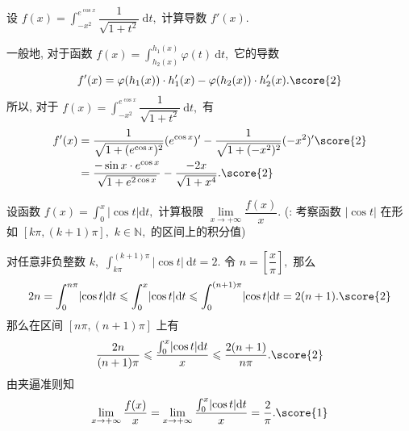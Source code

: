 \begin{question}[points = 6]
设 $\displaystyle f(x) = \int_{-x^2}^{e^{\cos x}} \dfrac{1}{\sqrt{1 + t^2}} ~ \mathrm{d}t,$ 计算导数 $f'(x).$

\end{question}

\begin{solution}
一般地, 对于函数 $\displaystyle f(x) = \int_{h_2(x)}^{h_1(x)} \varphi(t) ~ \mathrm{d}t,$ 它的导数
\begin{equation*}
f'(x) = \varphi(h_1(x)) \cdot h_1'(x) - \varphi(h_2(x)) \cdot h_2'(x). \score{2}
\end{equation*}
所以, 对于 $\displaystyle f(x) = \int_{-x^2}^{e^{\cos x}} \dfrac{1}{\sqrt{1 + t^2}} ~ \mathrm{d}t,$ 有
\begin{align*}
f'(x) & = \dfrac{1}{\sqrt{1 + (e^{\cos x})^2}}(e^{\cos x})' - \dfrac{1}{\sqrt{1 + (-x^2)^2}} (-x^2)' \score{2} \\
& = \dfrac{-\sin x \cdot e^{\cos x}}{\sqrt{1 + e^{2\cos x}}} - \dfrac{-2x}{\sqrt{1 + x^4}}. \score{2}
\end{align*}
\end{solution}


\begin{question}[points = 6]
设函数 $f(x) = \int_0^x \lvert \cos t \rvert \mathrm{d} t,$ 计算极限 $\lim\limits_{x\to+\infty} \dfrac{f(x)}{x}.$\newline
(: 考察函数 $\lvert \cos t \rvert$ 在形如 $[k\pi, (k+1)\pi],$ $k \in \mathbb{N},$ 的区间上的积分值)

\end{question}

\begin{solution}
对任意非负整数 $k,$ $\int_{k\pi}^{(k+1)\pi} \lvert \cos t \rvert ~ \mathrm{d} t = 2.$ 
令 $n = \left[ \dfrac{x}{\pi} \right],$ 那么
\begin{equation*}
2n = \int_0^{n\pi} \lvert \cos t \rvert \mathrm{d} t \leqslant \int_0^x \lvert \cos t \rvert \mathrm{d} t \leqslant \int_0^{(n+1)\pi} \lvert \cos t \rvert \mathrm{d} t = 2(n+1). \score{2}
\end{equation*}
那么在区间 $[n\pi, (n+1)\pi]$ 上有
\begin{equation*}
\dfrac{2n}{(n+1)\pi} \leqslant \dfrac{\int_0^x \lvert \cos t \rvert \mathrm{d} t}{x} \leqslant \dfrac{2(n+1)}{n\pi}. \score{2}
\end{equation*}
由夹逼准则知
\begin{equation*}
\lim\limits_{x\to+\infty} \dfrac{f(x)}{x} = \lim\limits_{x\to+\infty} \dfrac{\int_0^x \lvert \cos t \rvert \mathrm{d} t}{x} = \dfrac{2}{\pi}. \score{1}
\end{equation*}
\end{solution}


